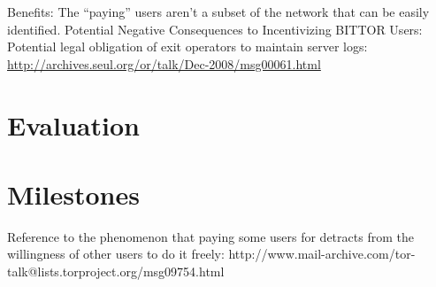 \documentclass[letterpaper]{article}
\begin{document}
Benefits:
The “paying” users aren’t a subset of the network that can be easily identified.
Potential Negative Consequences to Incentivizing BITTOR Users:
Potential legal obligation of exit operators to maintain server logs:
\url{http://archives.seul.org/or/talk/Dec-2008/msg00061.html}

\section{Evaluation}\label{sec:evaluation}
\section{Milestones}\label{sec:milestones}






Reference to the phenomenon that paying some users for detracts from
the willingness of other users to do it freely:
http://www.mail-archive.com/tor-talk@lists.torproject.org/msg09754.html





\end{document}
